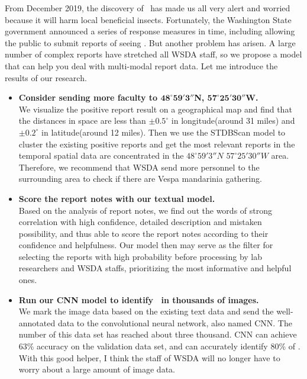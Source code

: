 \documentclass{mcmthesis}
\begin{document}
    From December 2019, the discovery of \VM\ has made us all very alert and worried because it will harm local beneficial insects. Fortunately, the Washington State government announced a series of response measures in time, including allowing the public to submit reports of seeing \VM. But another problem has arisen. A large number of complex reports have stretched all WSDA staff, so we propose a model that can help you deal with multi-modal report data. Let me introduce the results of our research.
    \begin{itemize}
       \item \textbf{Consider sending more faculty to $\mathbf{48^\circ59'3''}$N, $\mathbf{57^\circ25'30''}$W.} \\
        We visualize the positive report result on a geographical map and find that the distances in space are less than $\pm 0.5^\circ$ in longitude(around 31 miles) and $\pm 0.2^\circ$ in latitude(around 12 miles). Then we use the STDBScan model to cluster the existing positive reports and get the most relevant reports in the temporal spatial data are concentrated in the $48^\circ59'3''N$ $57^\circ25'30''W$ area. Therefore, we recommend that WSDA send more personnel to the surrounding area to check if there are Vespa mandarinia gathering.

        \item \textbf{Score the report notes with our textual model.} \\
        Based on the analysis of report notes, we find out the words of strong correlation with high confidence, detailed description and mistaken possibility, and thus able to score the report notes according to their confidence and helpfulness. Our model then may serve as the filter for selecting the reports with high probability before processing by lab researchers and WSDA staffs, prioritizing the most informative and helpful ones.

        \item \textbf{Run our CNN model to identify \VM\ in thousands of images.} \\
        We mark the image data based on the existing text data and send the well-annotated data to the convolutional neural network, also named CNN. The number of this data set has reached about three thousand. CNN can achieve 63\% accuracy on the validation data set, and can accurately identify 80\% of \VM. With this good helper, I think the staff of WSDA will no longer have to worry about a large amount of image data.


\end{itemize}
\end{document}

